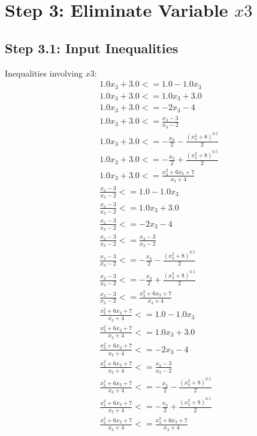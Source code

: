 \documentclass{article}
\begin{document}
\section{Step 3: Eliminate Variable $x3$}

\subsection{Step 3.1: Input Inequalities}

Inequalities involving $x3$:
\begin{align}
& 1.0 x_{3} + 3.0 <= 1.0 - 1.0 x_{3} \\
& 1.0 x_{3} + 3.0 <= 1.0 x_{3} + 3.0 \\
& 1.0 x_{3} + 3.0 <= - 2 x_{3} - 4 \\
& 1.0 x_{3} + 3.0 <= \frac{x_{3} - 3}{x_{3} - 2} \\
& 1.0 x_{3} + 3.0 <= - \frac{x_{3}}{2} - \frac{\left(x_{3}^{2} + 8\right)^{0.5}}{2} \\
& 1.0 x_{3} + 3.0 <= - \frac{x_{3}}{2} + \frac{\left(x_{3}^{2} + 8\right)^{0.5}}{2} \\
& 1.0 x_{3} + 3.0 <= \frac{x_{3}^{2} + 6 x_{3} + 7}{x_{3} + 4} \\
& \frac{x_{3} - 3}{x_{3} - 2} <= 1.0 - 1.0 x_{3} \\
& \frac{x_{3} - 3}{x_{3} - 2} <= 1.0 x_{3} + 3.0 \\
& \frac{x_{3} - 3}{x_{3} - 2} <= - 2 x_{3} - 4 \\
& \frac{x_{3} - 3}{x_{3} - 2} <= \frac{x_{3} - 3}{x_{3} - 2} \\
& \frac{x_{3} - 3}{x_{3} - 2} <= - \frac{x_{3}}{2} - \frac{\left(x_{3}^{2} + 8\right)^{0.5}}{2} \\
& \frac{x_{3} - 3}{x_{3} - 2} <= - \frac{x_{3}}{2} + \frac{\left(x_{3}^{2} + 8\right)^{0.5}}{2} \\
& \frac{x_{3} - 3}{x_{3} - 2} <= \frac{x_{3}^{2} + 6 x_{3} + 7}{x_{3} + 4} \\
& \frac{x_{3}^{2} + 6 x_{3} + 7}{x_{3} + 4} <= 1.0 - 1.0 x_{3} \\
& \frac{x_{3}^{2} + 6 x_{3} + 7}{x_{3} + 4} <= 1.0 x_{3} + 3.0 \\
& \frac{x_{3}^{2} + 6 x_{3} + 7}{x_{3} + 4} <= - 2 x_{3} - 4 \\
& \frac{x_{3}^{2} + 6 x_{3} + 7}{x_{3} + 4} <= \frac{x_{3} - 3}{x_{3} - 2} \\
& \frac{x_{3}^{2} + 6 x_{3} + 7}{x_{3} + 4} <= - \frac{x_{3}}{2} - \frac{\left(x_{3}^{2} + 8\right)^{0.5}}{2} \\
& \frac{x_{3}^{2} + 6 x_{3} + 7}{x_{3} + 4} <= - \frac{x_{3}}{2} + \frac{\left(x_{3}^{2} + 8\right)^{0.5}}{2} \\
& \frac{x_{3}^{2} + 6 x_{3} + 7}{x_{3} + 4} <= \frac{x_{3}^{2} + 6 x_{3} + 7}{x_{3} + 4}
\end{align}
\end{document}
